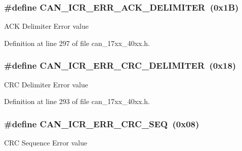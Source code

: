\subsubsection[{\texorpdfstring{C\+A\+N\+\_\+\+I\+C\+R\+\_\+\+E\+R\+R\+\_\+\+A\+C\+K\+\_\+\+D\+E\+L\+I\+M\+I\+T\+ER}{CAN_ICR_ERR_ACK_DELIMITER}}]{\setlength{\rightskip}{0pt plus 5cm}\#define C\+A\+N\+\_\+\+I\+C\+R\+\_\+\+E\+R\+R\+\_\+\+A\+C\+K\+\_\+\+D\+E\+L\+I\+M\+I\+T\+ER~(0x1\+B)}\hypertarget{group__CAN__17XX__40XX_gaa073aa014b3274b624a476395bb3865a}{}\label{group__CAN__17XX__40XX_gaa073aa014b3274b624a476395bb3865a}
A\+CK Delimiter Error value 

Definition at line 297 of file can\+\_\+17xx\+\_\+40xx.\+h.

\subsubsection[{\texorpdfstring{C\+A\+N\+\_\+\+I\+C\+R\+\_\+\+E\+R\+R\+\_\+\+C\+R\+C\+\_\+\+D\+E\+L\+I\+M\+I\+T\+ER}{CAN_ICR_ERR_CRC_DELIMITER}}]{\setlength{\rightskip}{0pt plus 5cm}\#define C\+A\+N\+\_\+\+I\+C\+R\+\_\+\+E\+R\+R\+\_\+\+C\+R\+C\+\_\+\+D\+E\+L\+I\+M\+I\+T\+ER~(0x18)}\hypertarget{group__CAN__17XX__40XX_gaa6defe8882ac6fb2e0048afa6bec7205}{}\label{group__CAN__17XX__40XX_gaa6defe8882ac6fb2e0048afa6bec7205}
C\+RC Delimiter Error value 

Definition at line 293 of file can\+\_\+17xx\+\_\+40xx.\+h.

\subsubsection[{\texorpdfstring{C\+A\+N\+\_\+\+I\+C\+R\+\_\+\+E\+R\+R\+\_\+\+C\+R\+C\+\_\+\+S\+EQ}{CAN_ICR_ERR_CRC_SEQ}}]{\setlength{\rightskip}{0pt plus 5cm}\#define C\+A\+N\+\_\+\+I\+C\+R\+\_\+\+E\+R\+R\+\_\+\+C\+R\+C\+\_\+\+S\+EQ~(0x08)}\hypertarget{group__CAN__17XX__40XX_ga796e6b5aaf64f404e0d6960ce0dc2945}{}\label{group__CAN__17XX__40XX_ga796e6b5aaf64f404e0d6960ce0dc2945}
C\+RC Sequence Error value 

